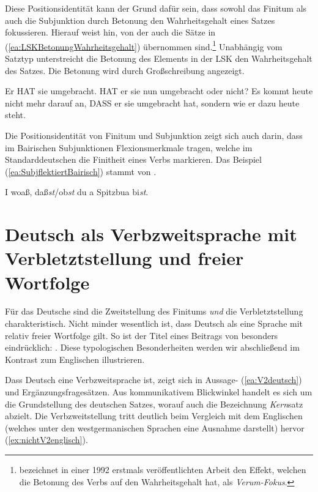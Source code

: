 Diese Positionsidentität kann der Grund dafür sein, dass sowohl das Finitum als auch die Subjunktion durch Betonung den Wahrheitsgehalt eines Satzes fokussieren. Hierauf weist \citet[148]{Reis1987} hin, von der auch die Sätze in (\ref{ea:LSKBetonungWahrheitsgehalt}) übernommen sind.\footnote{\citet[383]{Hoehle1992_2018} bezeichnet in einer 1992 erstmals veröffentlichten Arbeit den Effekt, welchen die Betonung des Verbs auf den Wahrheitsgehalt hat, als \textit{Verum-Fokus}.} Unabhängig vom Satztyp unterstreicht die Betonung des Elements in der LSK den Wahrheitsgehalt des Satzes. Die Betonung wird durch Großschreibung angezeigt.

\ea \label{ea:LSKBetonungWahrheitsgehalt}
\ea \label{ea:V2LSKBetonung} Er HAT sie umgebracht.
\ex \label{ex:V1LSKBEtonung} HAT er sie nun umgebracht oder nicht?
\ex \label{ex:VletztLSKBetonung} Es kommt heute nicht mehr darauf an, DASS er sie umgebracht hat, sondern wie er dazu heute steht.
\z 
\z 

Die Positionsidentität von Finitum und Subjunktion zeigt sich auch darin, dass \zB im Bairischen Subjunktionen Flexionsmerkmale tragen, welche im Standarddeutschen die Finitheit eines Verbs markieren. Das Beispiel (\ref{ea:SubjflektiertBairisch}) stammt von \citet[207]{Grewendorf1988}. 

\ea \label{ea:SubjflektiertBairisch} I woaß, daß\textit{st}/ob\textit{st} du a Spitzbua bi\textit{st}.
\z


\section{Deutsch als Verbzweitsprache mit Verbletztstellung und freier Wortfolge}\label{section:DeutschV2VletztfreieWortstellung}

Für das Deutsche sind die Zweitstellung des Finitums \textit{und} die Verbletztstellung charakteristisch. Nicht minder wesentlich ist, dass Deutsch als eine Sprache mit relativ freier Wortfolge gilt. So ist der Titel eines Beitrags von \citet{Haftka1996} besonders eindrücklich: . Diese typologischen Besonderheiten werden wir abschließend im Kontrast zum Englischen illustrieren.

Dass Deutsch eine Verbzweitsprache ist, zeigt sich in Aussage- (\ref{ea:V2deutsch}) und Ergänzungsfragesätzen. Aus kommunikativem Blickwinkel handelt es sich um die Grundstellung des deutschen Satzes, worauf auch die Bezeichnung \textit{Kern}satz abzielt. Die Verbzweitstellung tritt deutlich beim Vergleich mit dem Englischen (welches unter den westgermanischen Sprachen eine Ausnahme darstellt) hervor (\ref{ex:nichtV2englisch}).

